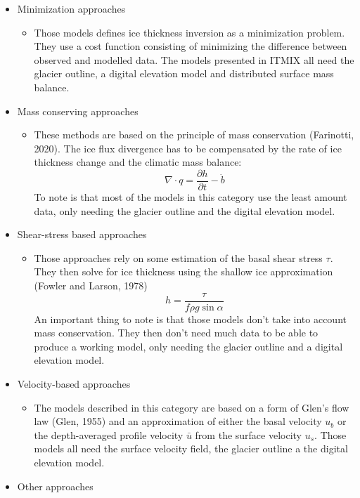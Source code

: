 \documentclass[a4, 12pt]{article}
\begin{document}
\begin{itemize}
	\item Minimization approaches
		\begin{itemize}
			\item Those models defines ice thickness inversion as a minimization problem. They use a cost 					function consisting of minimizing the difference between observed and modelled data. 						The models presented in ITMIX all need the glacier outline, a digital elevation model 					and distributed surface mass balance.
		\end{itemize}
	\item Mass conserving approaches
		\begin{itemize}
			\item These methods are based on the principle of mass conservation (Farinotti, 2020). The 						ice flux divergence has to be compensated by the rate of ice thickness change and the 						climatic mass balance:
				\[\nabla \cdot q = \frac{\partial h}{\partial t} - \dot{b}\]
				To note is that most of the models in this category use the least amount data, only						needing the glacier outline and the digital elevation model.
		\end{itemize}
	\item Shear-stress based approaches
		\begin{itemize}
			\item Those approaches rely on some estimation of the basal shear stress $\tau$. They then 					solve for ice thickness using the shallow ice approximation (Fowler and Larson, 1978)
			\[h = \frac{\tau}{f\rho g \sin{\alpha}}\]
			An important thing to note is that those models don't take into account mass conservation. 					They then don't need much data to be able to produce a working model, only needing the 						glacier outline and a digital elevation model.
		\end{itemize}
	\item Velocity-based approaches
		\begin{itemize}
			\item The models described in this category are based on a form of Glen's flow law (Glen, 					1955) and an approximation of either the basal velocity $u_b$ or the depth-averaged profile 				velocity $\bar{u}$ from the surface velocity $u_s$. Those models all need the surface 						velocity field, the glacier outline a the digital elevation model.
		\end{itemize} 
	\item Other approaches

\end{itemize}
\end{document}
